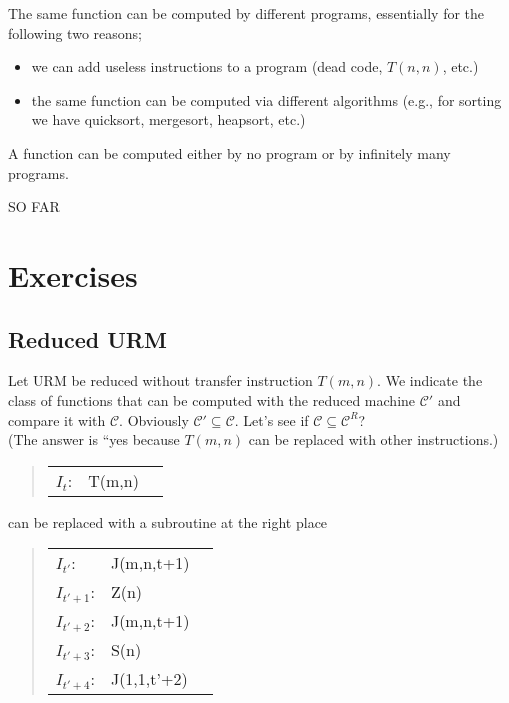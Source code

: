 \begin{remark}
  The same function can be computed by different programs, essentially for the following two reasons;

  \begin{itemize}
  \item we can add useless instructions to a program (dead code, $T(n,n)$, etc.)

  \item the same function can be computed via different algorithms
    (e.g., for sorting we have quicksort, mergesort, heapsort, etc.)
  \end{itemize}

  A function can be computed either by no program or by infinitely many programs.
\end{remark}


SO FAR

\section {Exercises}

\subsection{Reduced URM}

Let URM be reduced without transfer instruction $T(m, n)$. We indicate the class
of functions that can be computed with the reduced machine $ \mathcal{C}' $ and
compare it with $ \mathcal{C} $. Obviously $ \mathcal{C}' \subseteq \mathcal{C}
$. Let's see if $ \mathcal{C} \subseteq \mathcal{C}^R$? \\
(The answer is ``yes because $T(m, n)$ can be replaced with other instructions.)

\begin{quote}
  \begin{tabular}{lll}
    $I_t$: & T(m,n) \\
  \end{tabular}
\end{quote}

can be replaced with a subroutine at the right place

\begin{quote}
  \begin{tabular}{lll}
    $I_{t'}$:   & J(m,n,t+1)  \\
    $I_{t'+1}$: & Z(n)        \\
    $I_{t'+2}$: & J(m,n,t+1)  \\
    $I_{t'+3}$: & S(n)        \\
    $I_{t'+4}$: & J(1,1,t'+2) \\
  \end{tabular}
\end{quote}

